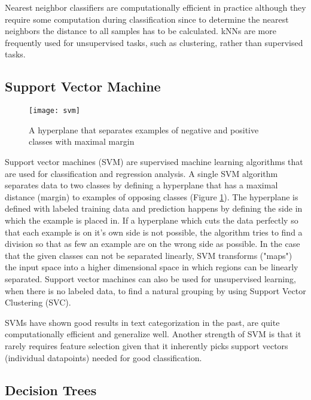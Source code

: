 Nearest neighbor classifiers are computationally efficient in practice although they require some computation during classification since to determine the nearest neighbors the distance to all samples has to be calculated.
\cite{hotho}
kNNs are more frequently used for unsupervised tasks, such as clustering, rather than supervised tasks.
\cite{rigutini2004}



\subsection{Support Vector Machine} \label{Support Vector Machine}
\begin{figure}[t]
\texttt{[image: svm]}
\centering
\caption{A hyperplane that separates examples of negative and positive classes with maximal margin}
\label{fig:svm}
\end{figure}
Support vector machines (SVM) are supervised machine learning algorithms that are used for classification and regression analysis.
A single SVM algorithm separates data to two classes by defining a hyperplane that has a maximal distance (margin) to examples of opposing classes (Figure \ref{fig:svm}).
The hyperplane is defined with labeled training data and prediction happens by defining the side in which the example is placed in. If a hyperplane which cuts the data perfectly so that each example is on it's own side is not possible, the algorithm tries to find a division so that as few an example are on the wrong side as possible.
\cite{hotho}
In the case that the given classes can not be separated linearly, SVM transforms ("maps") the input space into a higher dimensional space in which regions can be linearly separated.
\cite{rigutini2004}
Support vector machines can also be used for unsupervised learning, when there is no labeled data, to find a natural grouping by using Support Vector Clustering (SVC)\cite{ben-hur2001}.

SVMs have shown good results in text categorization in the past, are quite computationally efficient and generalize well. Another strength of SVM is that it rarely requires feature selection given that it inherently picks support vectors (individual datapoints) needed for good classification.  \cite{hotho}

\subsection{Decision Trees} \label{Decision Trees}

